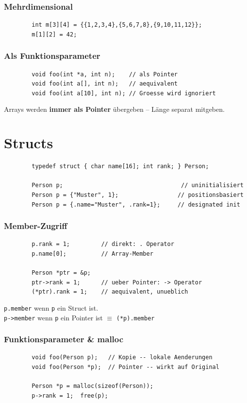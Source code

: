 \documentclass[a4paper,9pt]{article}
\begin{document}
	\subsubsection{Mehrdimensional}
	\begin{lstlisting}
		int m[3][4] = {{1,2,3,4},{5,6,7,8},{9,10,11,12}};
		m[1][2] = 42;
	\end{lstlisting}
	
	\subsubsection{Als Funktionsparameter}
	\begin{lstlisting}
		void foo(int *a, int n);    // als Pointer
		void foo(int a[], int n);   // aequivalent
		void foo(int a[10], int n); // Groesse wird ignoriert
	\end{lstlisting}
	\begin{tcolorbox}
		Arrays werden \textbf{immer als Pointer} übergeben -- Länge separat mitgeben.
	\end{tcolorbox}
	
	\section{Structs}
	\begin{lstlisting}
		typedef struct { char name[16]; int rank; } Person;
		
		Person p;                                  // uninitialisiert
		Person p = {"Muster", 1};                 // positionsbasiert
		Person p = {.name="Muster", .rank=1};     // designated init
	\end{lstlisting}
	
	\subsubsection{Member-Zugriff}
	\begin{lstlisting}
		p.rank = 1;         // direkt: . Operator
		p.name[0];          // Array-Member
		
		Person *ptr = &p;
		ptr->rank = 1;      // ueber Pointer: -> Operator
		(*ptr).rank = 1;    // aequivalent, unueblich
	\end{lstlisting}
	
	\begin{tcolorbox}
		\texttt{p.member} wenn \texttt{p} ein Struct ist.\\
		\texttt{p->member} wenn \texttt{p} ein Pointer ist $\equiv$ \texttt{(*p).member}
	\end{tcolorbox}
	
	\subsubsection{Funktionsparameter \& malloc}
	\begin{lstlisting}
		void foo(Person p);   // Kopie -- lokale Aenderungen
		void foo(Person *p);  // Pointer -- wirkt auf Original
		
		Person *p = malloc(sizeof(Person));
		p->rank = 1;  free(p);
	\end{lstlisting}
	
\end{document}
